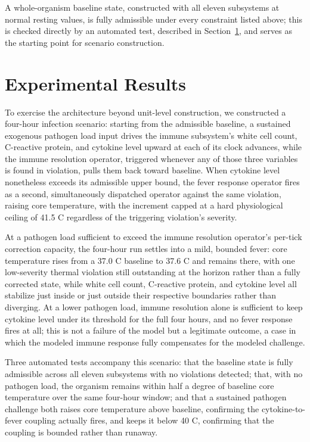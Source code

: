 \documentclass[11pt]{article}
\begin{document}
A whole-organism baseline state, constructed with all eleven subsystems at normal resting values, is fully admissible under every constraint listed above; this is checked directly by an automated test, described in Section~\ref{sec:results}, and serves as the starting point for scenario construction.

\section{Experimental Results}
\label{sec:results}

To exercise the architecture beyond unit-level construction, we constructed a four-hour infection scenario: starting from the admissible baseline, a sustained exogenous pathogen load input drives the immune subsystem's white cell count, C-reactive protein, and cytokine level upward at each of its clock advances, while the immune resolution operator, triggered whenever any of those three variables is found in violation, pulls them back toward baseline. When cytokine level nonetheless exceeds its admissible upper bound, the fever response operator fires as a second, simultaneously dispatched operator against the same violation, raising core temperature, with the increment capped at a hard physiological ceiling of 41.5 \textdegree C regardless of the triggering violation's severity.

At a pathogen load sufficient to exceed the immune resolution operator's per-tick correction capacity, the four-hour run settles into a mild, bounded fever: core temperature rises from a 37.0 \textdegree C baseline to 37.6 \textdegree C and remains there, with one low-severity thermal violation still outstanding at the horizon rather than a fully corrected state, while white cell count, C-reactive protein, and cytokine level all stabilize just inside or just outside their respective boundaries rather than diverging. At a lower pathogen load, immune resolution alone is sufficient to keep cytokine level under its threshold for the full four hours, and no fever response fires at all; this is not a failure of the model but a legitimate outcome, a case in which the modeled immune response fully compensates for the modeled challenge.

Three automated tests accompany this scenario: that the baseline state is fully admissible across all eleven subsystems with no violations detected; that, with no pathogen load, the organism remains within half a degree of baseline core temperature over the same four-hour window; and that a sustained pathogen challenge both raises core temperature above baseline, confirming the cytokine-to-fever coupling actually fires, and keeps it below 40 \textdegree C, confirming that the coupling is bounded rather than runaway.
\end{document}
